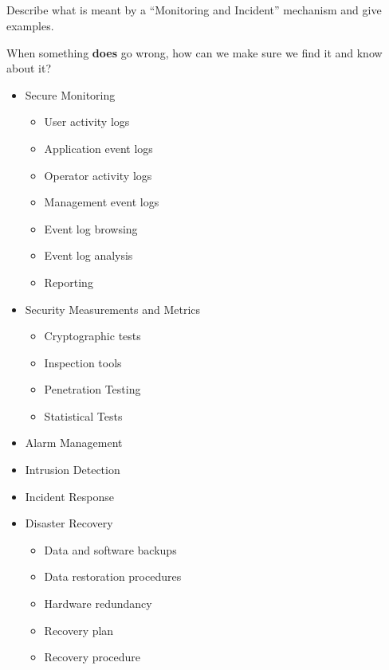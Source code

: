 \begin{questions}
\begin{parts}
  \part{} Describe what is meant by a ``Monitoring and Incident'' mechanism and give examples.
    \begin{solution}
      When something \textbf{does} go wrong, how can we make sure we find it and know about it?
      \begin{itemize}[noitemsep]
      \item Secure Monitoring
        \begin{itemize}[noitemsep]
        \item User activity logs
        \item Application event logs
        \item Operator activity logs
        \item Management event logs
        \item Event log browsing
        \item Event log analysis
        \item Reporting
        \end{itemize}
      \item Security Measurements and Metrics
        \begin{itemize}[noitemsep]
        \item Cryptographic tests
        \item Inspection tools
        \item Penetration Testing
        \item Statistical Tests
        \end{itemize}
      \item Alarm Management
      \item Intrusion Detection
      \item Incident Response
      \item Disaster Recovery
        \begin{itemize}[noitemsep]
        \item Data and software backups
        \item Data restoration procedures
        \item Hardware redundancy
        \item Recovery plan
        \item Recovery procedure
        \end{itemize}
      \end{itemize}
    \end{solution}
  \end{parts}


\end{questions}
